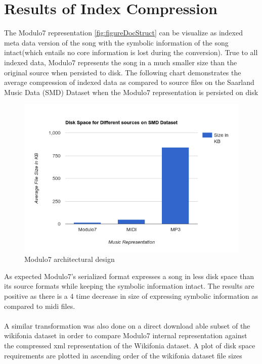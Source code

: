 \section{Results of Index Compression}

\noindent The Modulo7 representation \ref{fig:figureDocStruct} can be visualize as indexed meta data version of the song with the symbolic information of the song intact(which entails no core information is lost during the conversion). True to all indexed data, Modulo7 represents the song in a much smaller size than the original source when persisted to disk. The following chart demonstrates the average compression of indexed data as compared to source files on the Saarland Music Data (SMD) Dataset \cite{saarlandmsd} when the Modulo7 representation is persisted on disk 

\begin{figure}[!htb]
\centering
\includegraphics[width=\textwidth]{Modulo7SMDBarGraph.png}
\makeatletter
\let\@currsize\normalsize
\caption{Modulo7 architectural design}
\label{fig:figure}
\end{figure}
\noindent As expected Modulo7's serialized format expresses a song in less disk space than its source formats while keeping the symbolic information intact. The results are positive as there is a 4 time decrease in size of expressing symbolic information as compared to midi files. \\\\
A similar transformation was also done on a direct download able subset of the wikifonia dataset \cite{WikifoniaDataset} in order to compare Modulo7 internal representation against the compressed xml representation of the Wikifonia dataset. A plot of disk space requirements are plotted in ascending order of the wikifonia dataset file sizes \\
